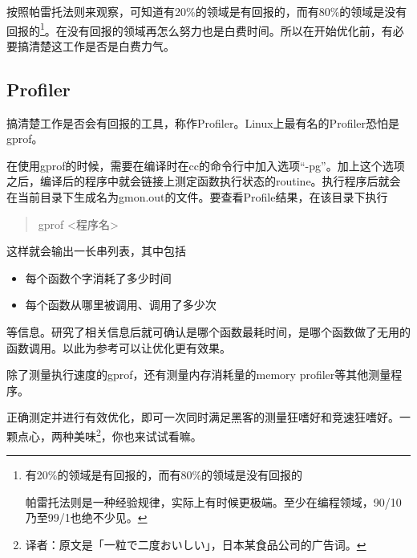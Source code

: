 \documentclass[a4paper,12pt]{article}
\begin{document}
按照帕雷托法则来观察，可知道有20\%的领域是有回报的，而有80\%的领域是没有回报的\footnote{有20\%的领域是有回报的，而有80\%的领域是没有回报的

帕雷托法则是一种经验规律，实际上有时候更极端。至少在编程领域，90/10乃至99/1也绝不少见。}。在没有回报的领域再怎么努力也是白费时间。所以在开始优化前，有必要搞清楚这工作是否是白费力气。

\subsection{Profiler}

搞清楚工作是否会有回报的工具，称作Profiler。Linux上最有名的Profiler恐怕是gprof。

在使用gprof的时候，需要在编译时在cc的命令行中加入选项“-pg”。加上这个选项之后，编译后的程序中就会链接上测定函数执行状态的routine。执行程序后就会在当前目录下生成名为gmon.out的文件。要查看Profile结果，在该目录下执行
\begin{quote}
  gprof <程序名>
\end{quote}
这样就会输出一长串列表，其中包括
\begin{itemize}
\item 每个函数个字消耗了多少时间
\item 每个函数从哪里被调用、调用了多少次
\end{itemize}
等信息。研究了相关信息后就可确认是哪个函数最耗时间，是哪个函数做了无用的函数调用。以此为参考可以让优化更有效果。

除了测量执行速度的gprof，还有测量内存消耗量的memory profiler等其他测量程序。

正确测定并进行有效优化，即可一次同时满足黑客的测量狂嗜好和竞速狂嗜好。一颗点心，两种美味\footnote{译者：原文是「一粒で二度おいしい」，日本某食品公司的广告词。}，你也来试试看嘛。

\end{document}
